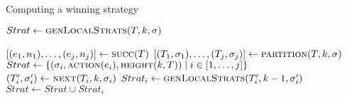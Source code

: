 


\begin{algorithm}
   \caption{Computing a winning strategy}\label{alg:strat}
   \begin{algorithmic}[1]
            \State $Strat \gets \Call{genLocalStrats}{T, k, \sigma}$
            \State {}
        \EndFunction
        \Statex

            \State $[(e_1, n_1),\ldots,(e_j, n_j)] \gets \Call{succ}{T}$
            \State $[(T_1,\sigma_1),\ldots,(T_j, \sigma_j)] \gets \Call{partition}{T, k, \sigma}$
            \State $Strat \gets \{(\sigma_i, \Call{action}{e_i}, \Call{height}{k, T}) \mid i \in[1,\ldots,j]\}$\label{alg:strat:strati}
            \label{alg:strat:for}
            \State $(T_i', \sigma_i') \gets \Call{next}{T_i, k, \sigma_i}$\label{alg:strat:next}
                \State $Strat_i \gets \Call{genLocalStrats}{T_i', k-1, \sigma_i'}$\label{alg:strat:rec}
                \State $Strat \gets Strat \cup Strat_i$
            \EndFor\label{alg:strat:endfor}
            \State {} \label{alg:strat:return}
        \EndFunction
    \end{algorithmic}
\end{algorithm}


